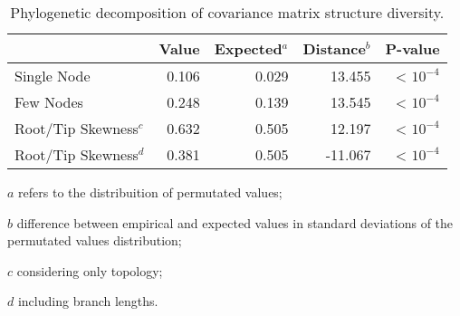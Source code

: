 \begin{table}[ht]
  \centering
  \begin{threeparttable}
  \caption{Phylogenetic decomposition of covariance matrix structure diversity. \label{tab:riem_decdiv}}
  \begin{tabular}{lrrrr}
    \toprule
    & \textbf{Value} & \textbf{Expected$^a$} & \textbf{Distance$^b$} & \textbf{P-value} \\ 
    \midrule
    Single Node & 0.106 & 0.029 & 13.455 & < $10^{-4}$ \\ 
    Few Nodes & 0.248 & 0.139 & 13.545 & < $10^{-4}$ \\ 
    Root/Tip Skewness$^c$ & 0.632 & 0.505 & 12.197 & < $10^{-4}$ \\ 
    Root/Tip Skewness$^d$ & 0.381 & 0.505 & -11.067 & < $10^{-4}$ \\ 
    \bottomrule
  \end{tabular}
  \begin{tablenotes}
    \footnotesize
    {
    \item[$a$] refers to the distribuition of permutated values;
    \item[$b$] difference between empirical and expected values in standard deviations of the permutated values distribution;
    \item[$c$] considering only topology;
    \item[$d$] including branch lengths.
    }
  \end{tablenotes}
\end{threeparttable}
\end{table}
